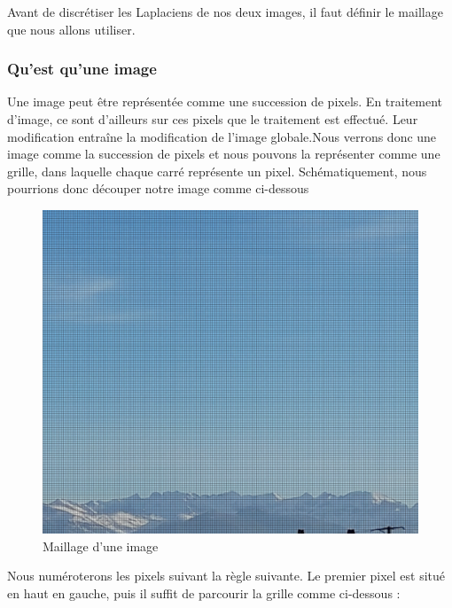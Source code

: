 Avant de discrétiser les Laplaciens de nos deux images, il faut définir le maillage que nous allons utiliser.
 
\subsubsection{Qu'est qu'une image}
Une image peut être représentée comme une succession de pixels. En traitement d'image, ce sont d'ailleurs sur ces pixels que le traitement est effectué. Leur modification entraîne la modification de l'image globale.Nous verrons donc une image comme la succession de pixels et nous pouvons la représenter comme une grille, dans laquelle chaque carré représente un pixel.  Schématiquement, nous pourrions donc découper notre image comme ci-dessous
    \begin{figure}[!htb]
        \centering
       \includegraphics[scale = 0.07]{Images/Montagne_grille.jpg}
        \caption{Maillage d'une image}
        \label{fig:my_label}
    \end{figure}
Nous numéroterons les pixels suivant la règle suivante. Le premier pixel est situé en haut en gauche, puis il suffit de parcourir la grille comme ci-dessous : 

